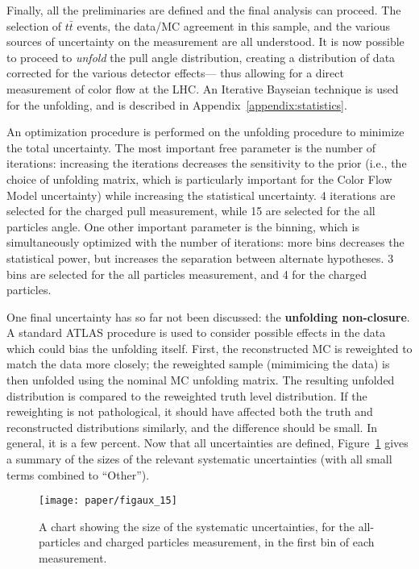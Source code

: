 Finally, all the preliminaries are defined and the final analysis can proceed. The selection of $t\bar{t}$ events, the data/MC agreement in this sample, and the various sources of uncertainty on the measurement are all understood. It is now possible to proceed to \textit{unfold} the pull angle distribution, creating a distribution of data corrected for the various detector effects--- thus allowing for a direct measurement of color flow at the LHC. An Iterative Bayseian technique is used for the unfolding, and is described in Appendix~\ref{appendix:statistics}.
	

An optimization procedure is performed on the unfolding procedure to minimize the total uncertainty. The most important free parameter is the number of iterations: increasing the iterations decreases the sensitivity to the prior (i.e., the choice of unfolding matrix, which is particularly important for the Color Flow Model uncertainty) while increasing the statistical uncertainty. 4 iterations are selected for the charged pull measurement, while 15 are selected for the all particles angle. One other important parameter is the binning, which is simultaneously optimized with the number of iterations: more bins decreases the statistical power, but increases the separation between alternate hypotheses. 3 bins are selected for the all particles measurement, and 4 for the charged particles.

One final uncertainty has so far not been discussed: the \textbf{unfolding non-closure}. A standard ATLAS procedure is used to  consider possible effects in the data which could bias the unfolding itself. First, the reconstructed MC is reweighted to match the data more closely; the reweighted sample (mimimicing the data) is then unfolded using the nominal MC unfolding matrix. The resulting unfolded distribution is compared to the reweighted truth level distribution. If the reweighting is not pathological, it should have affected both the truth and reconstructed distributions similarly, and the difference should be small. In general, it is a few percent. Now that all uncertainties are defined, Figure~\ref{fig:color:unfolding:uncert_chart} gives a summary of the sizes of the relevant systematic uncertainties (with all small terms combined to ``Other'').



\begin{figure}[htbp]
  \centering
    \texttt{[image: paper/figaux\_15]}
  \caption{A chart showing the size of the systematic uncertainties, for the all-particles and charged particles measurement, in the first bin of each measurement.}
  \label{fig:color:unfolding:uncert_chart}
\end{figure}

